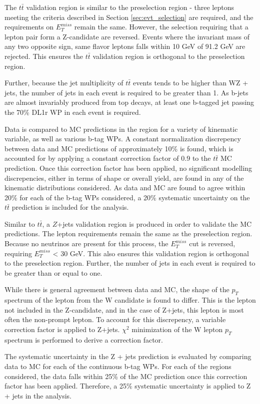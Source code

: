 The $t\bar{t}$ validation region is similar to the preselection region - three leptons meeting the criteria described in Section \ref{sec:evt_selection} are required, and the requirements on $E_T^{miss}$ remain the same. However, the selection requiring that a lepton pair form a Z-candidate are reversed. Events where the invariant mass of any two opposite sign, same flavor leptons falls within 10 GeV of 91.2 GeV are rejected. This ensures the $t\bar{t}$ validation region is orthogonal to the preselection region. 

Further, because the jet multiplicity of $t\bar{t}$ events tends to be higher than WZ + jets, the number of jets in each event is required to be greater than 1. As b-jets are almost invariably produced from top decays, at least one b-tagged jet passing the 70\% DL1r WP in each event is required. 

Data is compared to MC predictions in the region for a variety of kinematic variable, as well as various b-tag WPs. A constant normalization discrepency between data and MC predictions of approximately 10\% is found, which is accounted for by applying a constant correction factor of 0.9 to the $t\bar{t}$ MC prediction. Once this correction factor has been applied, no significant modelling discrepencies, either in terms of shape or overall yield, are found in any of the kinematic distributions considered. As data and MC are found to agree within 20\% for each of the b-tag WPs considered, a 20\% systematic uncertainty on the $t\bar{t}$ prediction is included for the analysis.

Similar to $t\bar{t}$, a $Z$+jets validation region is produced in order to validate the MC predictions. The lepton requirements remain the same as the preselection region. Because no neutrinos are present for this process, the $E_T^{miss}$ cut is reversed, requiring $E_T^{miss}$ < 30 GeV. This also ensures this validation region is orthogonal to the preselection region. Further, the number of jets in each event is required to be greater than or equal to one.

While there is general agreement between data and MC, the shape of the $p_T$ spectrum of the lepton from the W candidate is found to differ. This is the lepton not included in the Z-candidate, and in the case of Z+jets, this lepton is most often the non-prompt lepton. To account for this discrepency, a variable correction factor is applied to Z+jets. $\chi^2$ minimization of the W lepton $p_T$ spectrum is performed to derive a correction factor.

The systematic uncertainty in the Z + jets prediction is evaluated by comparing data to MC for each of the continuous b-tag WPs. For each of the regions considered, the data falls within 25\% of the MC prediction once this correction factor has been applied. Therefore, a 25\% systematic uncertainty is applied to Z + jets in the analysis.

